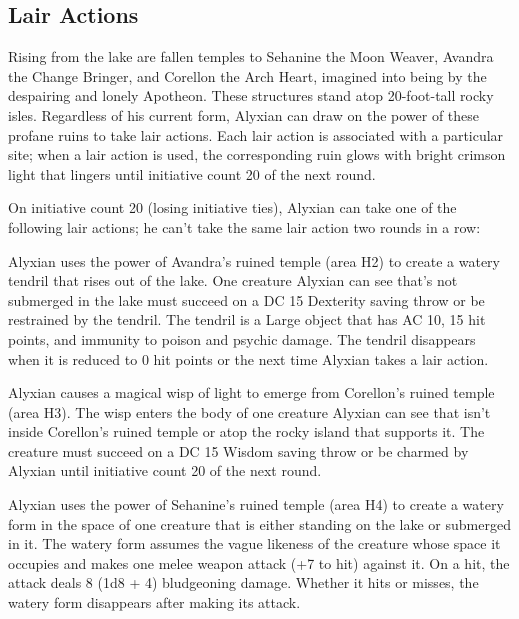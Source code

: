 \documentclass[10pt,a4paper,twoside,twocolumn,openany,nodeprecatedcode]{dndbook}
\begin{document}
\subsection{Lair Actions}
Rising from the lake are fallen temples to Sehanine the Moon Weaver, Avandra the Change Bringer, and Corellon the Arch Heart, imagined into being by the despairing and lonely Apotheon. These structures stand atop 20-foot-tall rocky isles. Regardless of his current form, Alyxian can draw on the power of these profane ruins to take lair actions. Each lair action is associated with a particular site; when a lair action is used, the corresponding ruin glows with bright crimson light that lingers until initiative count 20 of the next round.

On initiative count 20 (losing initiative ties), Alyxian can take one of the following lair actions; he can't take the same lair action two rounds in a row:


\begin{description}[nolistsep]
\item[Avandra's Grasp.]
Alyxian uses the power of Avandra's ruined temple (area H2) to create a watery tendril that rises out of the lake. One creature Alyxian can see that's not submerged in the lake must succeed on a DC 15 Dexterity saving throw or be restrained by the tendril. The tendril is a Large object that has AC 10, 15 hit points, and immunity to poison and psychic damage. The tendril disappears when it is reduced to 0 hit points or the next time Alyxian takes a lair action.
\item[Corellon's Charm.]
Alyxian causes a magical wisp of light to emerge from Corellon's ruined temple (area H3). The wisp enters the body of one creature Alyxian can see that isn't inside Corellon's ruined temple or atop the rocky island that supports it. The creature must succeed on a DC 15 Wisdom saving throw or be charmed by Alyxian until initiative count 20 of the next round.
\item[Sehanine's Torment.]
Alyxian uses the power of Sehanine's ruined temple (area H4) to create a watery form in the space of one creature that is either standing on the lake or submerged in it. The watery form assumes the vague likeness of the creature whose space it occupies and makes one melee weapon attack (+7 to hit) against it. On a hit, the attack deals 8 (1d8 + 4) bludgeoning damage. Whether it hits or misses, the watery form disappears after making its attack.
\end{description}
\end{document}
